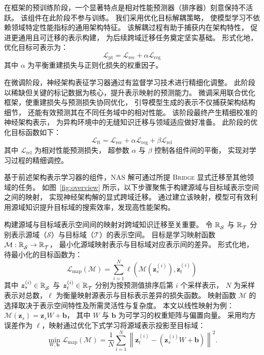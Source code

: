 \documentclass[../main.tex]{subfiles}
\begin{document}
在框架的预训练阶段，一个显著特点是相对性能预测器（排序器）刻意保持不活跃。
该组件在此阶段不参与训练。
我们采用优化目标解耦策略，
使模型学习不依赖领域特定性能指标的通用架构特征。
该解耦过程有助于捕获内在架构特性，
促进更通用且可迁移的表示构建，
为后续跨域迁移任务奠定坚实基础。
形式化地，优化目标可表示为：
\begin{equation}
	\mathcal{L}_\mathrm{pt} = \mathcal{L}_\mathrm{rec} + \alpha\mathcal{L}_\mathrm{reg}
\end{equation}
其中 $ \alpha $ 为平衡重建损失与正则化损失的权重因子。


在微调阶段，神经架构表征学习器通过有监督学习技术进行精细化调整。
此阶段以稀缺但关键的标记数据为核心，提升表示映射的预测能力。
微调采用联合优化框架，使重建损失与预测损失协同优化，
引导模型生成的表示不仅捕获架构结构细节，
还能有效预测其在不同任务域中的相对性能。
该阶段最终产生精细校准的神经架构表示，
为异构环境中的无缝知识迁移与领域适应做好准备。
此阶段的优化目标函数如下：
\begin{equation}
	\mathcal{L}_\mathrm{ft} = \mathcal{L}_\mathrm{rec} + \alpha\mathcal{L}_\mathrm{reg} + \beta\mathcal{L}_\mathrm{rel}
\end{equation}
其中 $ \mathcal{L}_\mathrm{rel} $ 为相对性能预测损失，
超参数 $ \alpha $ 与 $ \beta $ 控制各组件间的平衡，
实现对学习过程的精细调控。


基于前述架构表示学习器的组件，NAS 解可通过所提 \textsc{Bridge} 显式迁移至其他领域的任务。
如图~\ref{fig:overview} 所示，以下步骤聚焦于构建源域与目标域表示空间之间的映射，
实现神经架构解的显式跨域迁移。
通过建立该映射，模型可有效利用源域知识提升目标域的搜索效率，发现高性能架构。

构建源域与目标域表示空间间的映射对跨域知识迁移至关重要。
令 $ \mathbb{R}^{\mathstrut}_{\mathcal{S}} $ 与 $ \mathbb{R}^{\mathstrut}_{\mathcal{T}} $ 分别表示源域（$ \mathcal{S} $）与目标域（$ \mathcal{T} $）的表示空间。
目标是学习映射函数 $ \mathcal{M}: \mathbb{R}^{\mathstrut}_{\mathcal{S}} \rightarrow \mathbb{R}^{\mathstrut}_\mathcal{T} $，
最小化源域映射表示与目标域对应表示间的差异。
形式化地，待最小化的目标函数为：
\begin{equation}
	\mathcal{L}_\mathrm{map}(\mathcal{M}) = \sum_{i=1}^{N}{\ell\left(\mathcal{M}(\bm{z}_{s}^{(i)}),\bm{z}_{t}^{(i)}\right)}
\end{equation}
其中 $ \bm{z}^{(i)}_{s} \in \mathbb{R}^{\mathstrut}_{\mathcal{S}} $ 与 $ \bm{z}^{(i)}_{t} \in \mathbb{R}^{\mathstrut}_{\mathcal{T}} $ 分别为按预测值排序后第 $ i $ 个采样表示，
$ N $ 为采样表示对总数，$ \ell $ 为衡量映射源表示与目标表示差异的损失函数。
映射函数 $ \mathcal{M} $ 的选择取决于表示空间特性及所需灵活性与复杂度。
本文以线性映射为例：$ \mathcal{M}(\bm{z}_{s}) = \bm{z}_{s}W + \bm{b} $，
其中 $ W $ 与 $ \bm{b} $ 为可学习的权重矩阵与偏置向量。
采用均方误差作为 $ \ell $，映射通过优化下式学习将源域表示投影至目标域：
\begin{equation}
	\min_{W,\mathbf{b}} \mathcal{L}_\mathrm{map}(\mathcal{M}) = \frac{1}{N}\sum_{i=1}^{N}{\left\|\bm{z}_{t}^{(i)} - \left(\bm{z}_{s}^{(i)}W + \bm{b}\right)\right\|}^{2}.
\end{equation}
\end{document}
